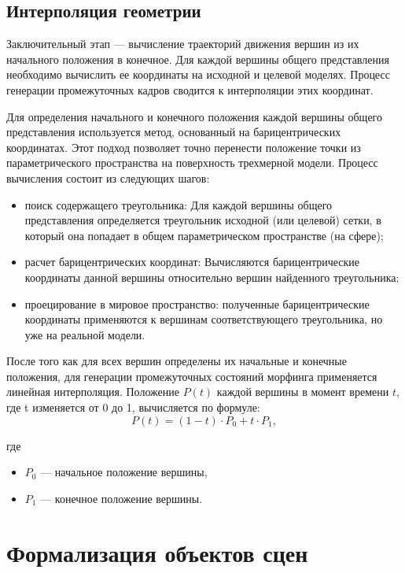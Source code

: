     \subsection{Интерполяция геометрии}
    Заключительный этап --- вычисление траекторий движения вершин из их начального положения в конечное. Для каждой вершины общего представления необходимо вычислить ее координаты на исходной и целевой моделях. Процесс генерации промежуточных кадров сводится к интерполяции этих координат.

    Для определения начального и конечного положения каждой вершины общего представления используется метод, основанный на барицентрических координатах. Этот подход позволяет точно перенести положение точки из параметрического пространства на поверхность трехмерной модели.
    Процесс вычисления состоит из следующих шагов:
    \begin{itemize}
        \item поиск содержащего треугольника: Для каждой вершины общего представления определяется треугольник исходной (или целевой) сетки, в который она попадает в общем параметрическом пространстве (на сфере);
        \item расчет барицентрических координат: Вычисляются барицентрические координаты данной вершины относительно вершин найденного треугольника;
        \item проецирование в мировое пространство: полученные барицентрические координаты применяются к вершинам соответствующего треугольника, но уже на реальной модели.
    \end{itemize}

    После того как для всех вершин определены их начальные и конечные положения, для генерации промежуточных состояний морфинга применяется линейная интерполяция. Положение $P(t)$ каждой вершины в момент времени $t$, где t изменяется от 0 до 1, вычисляется по формуле:
    \begin{equation}
        P(t) = (1 - t) \cdot P_0 + t \cdot P_1,
    \end{equation}

    где
    \begin{itemize}
        \item $P_0$ --- начальное положение вершины,
        \item $P_1$ --- конечное положение вершины.
    \end{itemize}
    
    \section{Формализация объектов сцен}
    
